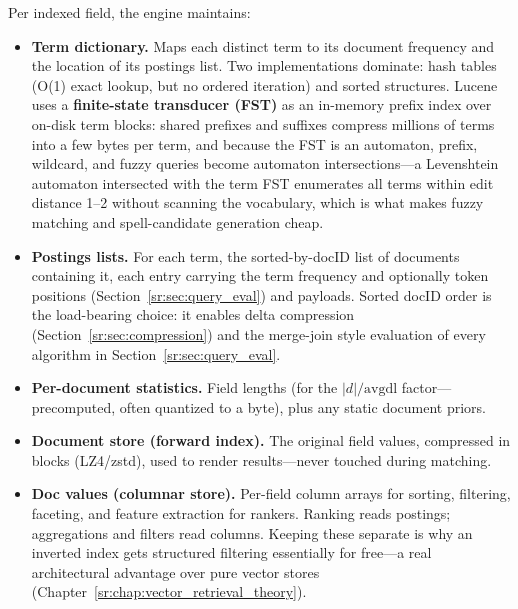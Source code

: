 Per indexed field, the engine maintains:

\begin{itemize}
    \item \textbf{Term dictionary.} Maps each distinct term to its document frequency and the location of its postings list. Two implementations dominate: hash tables (O(1) exact lookup, but no ordered iteration) and sorted structures. Lucene uses a \textbf{finite-state transducer (FST)} as an in-memory prefix index over on-disk term blocks: shared prefixes and suffixes compress millions of terms into a few bytes per term, and because the FST is an automaton, prefix, wildcard, and fuzzy queries become automaton intersections---a Levenshtein automaton intersected with the term FST enumerates all terms within edit distance 1--2 without scanning the vocabulary, which is what makes fuzzy matching and spell-candidate generation cheap.
    \item \textbf{Postings lists.} For each term, the sorted-by-docID list of documents containing it, each entry carrying the term frequency and optionally token positions (Section~\ref{sr:sec:query_eval}) and payloads. Sorted docID order is the load-bearing choice: it enables delta compression (Section~\ref{sr:sec:compression}) and the merge-join style evaluation of every algorithm in Section~\ref{sr:sec:query_eval}.
    \item \textbf{Per-document statistics.} Field lengths (for the $|d|/\text{avgdl}$ factor---precomputed, often quantized to a byte), plus any static document priors.
    \item \textbf{Document store (forward index).} The original field values, compressed in blocks (LZ4/zstd), used to render results---never touched during matching.
    \item \textbf{Doc values (columnar store).} Per-field column arrays for sorting, filtering, faceting, and feature extraction for rankers. Ranking reads postings; aggregations and filters read columns. Keeping these separate is why an inverted index gets structured filtering essentially for free---a real architectural advantage over pure vector stores (Chapter~\ref{sr:chap:vector_retrieval_theory}).
\end{itemize}

